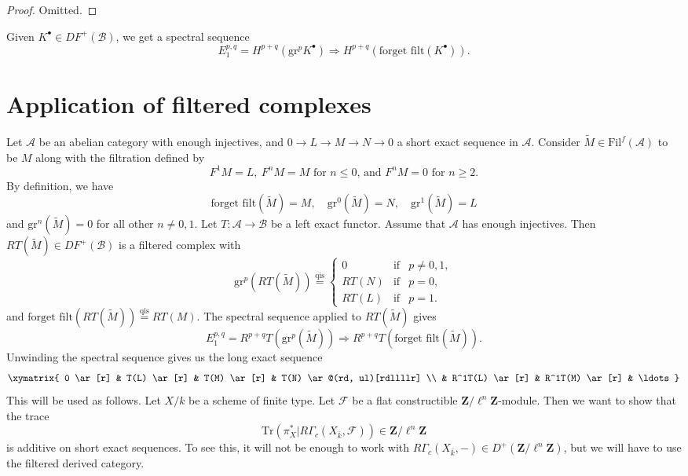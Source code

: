 \begin{proof}
Omitted.
\end{proof}

\noindent
Given $K^\bullet \in DF^+(\mathcal{B})$, we get a spectral sequence
$$
E_1^{p, q} = H^{p+q}(\text{gr}^p K^\bullet) \Rightarrow H^{p+q}(\text{forget
filt}(K^\bullet)).
$$






\section{Application of filtered complexes}
\label{section-applications-filtered}

\noindent
Let $\mathcal{A}$ be an abelian category with enough injectives, and
$0 \to L \to M \to N \to 0$ a short exact sequence in $\mathcal{A}$.
Consider $\widetilde M \in \text{Fil}^f(\mathcal{A})$ to be $M$ along with the
filtration defined by
$$
F^1M = L, \ F^nM = M
\text{ for }n \leq 0\text{, and }F^nM = 0\text{ for }n \geq 2.
$$
By definition, we have
$$
\text{forget filt}(\widetilde M) = M, \quad
\text{gr}^0(\widetilde M) = N, \quad
\text{gr}^1(\widetilde M) = L
$$
and $\text{gr}^n(\widetilde M) = 0$ for all other $n \neq 0, 1$. Let $T:
\mathcal{A} \to \mathcal{B}$ be a left exact functor. Assume that $\mathcal{A}$
has enough injectives. Then $RT(\widetilde M) \in DF^+(\mathcal{B})$ is a
filtered complex with
$$
\text{gr}^p(RT(\widetilde M))
\stackrel{\text{qis}}{=}
\left\{
\begin{matrix}
0 & \text{if} & p \neq 0, 1, \\
RT(N) & \text{if} & p = 0, \\
RT(L) & \text{if} & p = 1.
\end{matrix}
\right.
$$
and $\text{forget filt}(RT(\widetilde M))\stackrel{\text{qis}}{ = } RT(M)$. The
spectral sequence applied to $RT(\widetilde M)$ gives
$$
E_1^{p, q} = R^{p+q}T(\text{gr}^p(\widetilde M)) \Rightarrow
R^{p+q}T(\text{forget filt}(\widetilde M)).
$$
Unwinding the spectral sequence gives us the long exact sequence
$$
\xymatrix{
0 \ar[r] & T(L) \ar[r] & T(M) \ar[r] & T(N) \ar@(rd, ul)[rdllllr] \\
& R^1T(L) \ar[r] & R^1T(M) \ar[r] & \ldots
}
$$
This will be used as follows. Let $X/k$ be a scheme of finite type. Let
$\mathcal{F}$ be a flat constructible $\mathbf{Z}/\ell^n \mathbf{Z}$-module.
Then we want to show that the trace
$$
\text{Tr}( \pi_X^\ast | R\Gamma_c(X_{\bar k}, \mathcal{F})) \in
\mathbf{Z}/\ell^n \mathbf{Z}
$$
is additive on short exact sequences. To see this, it will not be enough to
work with $R\Gamma_c(X_{\bar k}, -) \in D^+(\mathbf{Z}/\ell^n \mathbf{Z})$, but
we will have to use the filtered derived category.







